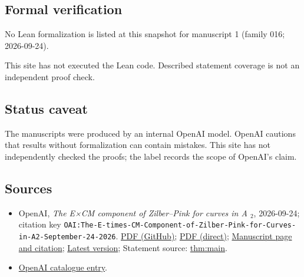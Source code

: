 \documentclass[11pt]{article}
\begin{document}
\subsection{Formal verification}
No Lean formalization is listed at this snapshot for manuscript 1 (family 016; 2026-09-24).

This site has not executed the Lean code. Described statement coverage is not an independent proof check.

\subsection{Status caveat}
The manuscripts were produced by an internal OpenAI model. OpenAI cautions that results without formalization can contain mistakes. This site has not independently checked the proofs; the label records the scope of OpenAI's claim.

\subsection{Sources}
\begin{itemize}
\item OpenAI, \emph{The E×CM component of Zilber–Pink for curves in A \({}_{2}\)}, 2026-09-24; citation key \texttt{OAI:The-E-times-CM-Component-of-Zilber-Pink-for-Curves-in-A2-September-24-2026}. \href{https://github.com/openai/math/blob/adc7f1241b42e322a6451854ab7e4b4c146bf78a/preprints/The-E-times-CM-Component-of-Zilber-Pink-for-Curves-in-A2-September-24-2026/paper.pdf}{PDF (GitHub)}; \href{https://github.com/openai/math/raw/adc7f1241b42e322a6451854ab7e4b4c146bf78a/preprints/The-E-times-CM-Component-of-Zilber-Pink-for-Curves-in-A2-September-24-2026/paper.pdf}{PDF (direct)}; \href{https://github.com/openai/math/blob/adc7f1241b42e322a6451854ab7e4b4c146bf78a/preprints/The-E-times-CM-Component-of-Zilber-Pink-for-Curves-in-A2-September-24-2026/README.md}{Manuscript page and citation}; \href{https://github.com/openai/math/blob/main/preprints/The-E-times-CM-Component-of-Zilber-Pink-for-Curves-in-A2-September-24-2026/paper.pdf}{Latest version}; Statement source: \href{https://github.com/openai/math/blob/adc7f1241b42e322a6451854ab7e4b4c146bf78a/preprints/The-E-times-CM-Component-of-Zilber-Pink-for-Curves-in-A2-September-24-2026/build/paper.tex\#L81}{thm:main}.
\item \href{https://github.com/openai/math/blob/adc7f1241b42e322a6451854ab7e4b4c146bf78a/CONTENTS.md}{OpenAI catalogue entry}.
\end{itemize}
\end{document}
